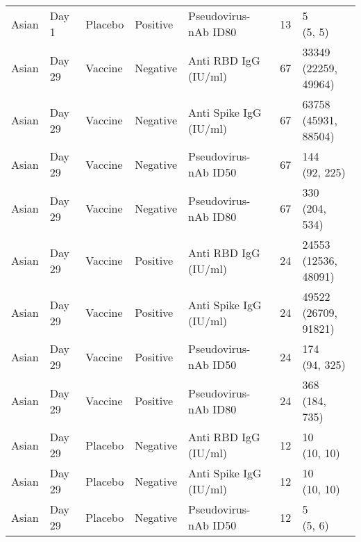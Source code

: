 \documentclass[]{book}
\theoremstyle{definition}
\theoremstyle{definition}
\theoremstyle{definition}
\newcommand{\1}{\mathbbm{1}}
\begin{document}
\begin{landscape}
\begin{ThreePartTable}
\begin{longtable}[t]{>{\raggedright\arraybackslash}p{7cm}llllll}
\hspace{1em}Asian & Day 1 & Placebo & Positive & Pseudovirus-nAb ID80 & 13 & \makecell[l]{5\\(5, 5)}\\
\hspace{1em}Asian & Day 29 & Vaccine & Negative & Anti RBD IgG (IU/ml) & 67 & \makecell[l]{33349\\(22259, 49964)}\\
\hspace{1em}Asian & Day 29 & Vaccine & Negative & Anti Spike IgG (IU/ml) & 67 & \makecell[l]{63758\\(45931, 88504)}\\
\hspace{1em}Asian & Day 29 & Vaccine & Negative & Pseudovirus-nAb ID50 & 67 & \makecell[l]{144\\(92, 225)}\\
\hspace{1em}Asian & Day 29 & Vaccine & Negative & Pseudovirus-nAb ID80 & 67 & \makecell[l]{330\\(204, 534)}\\
\hspace{1em}Asian & Day 29 & Vaccine & Positive & Anti RBD IgG (IU/ml) & 24 & \makecell[l]{24553\\(12536, 48091)}\\
\hspace{1em}Asian & Day 29 & Vaccine & Positive & Anti Spike IgG (IU/ml) & 24 & \makecell[l]{49522\\(26709, 91821)}\\
\hspace{1em}Asian & Day 29 & Vaccine & Positive & Pseudovirus-nAb ID50 & 24 & \makecell[l]{174\\(94, 325)}\\
\hspace{1em}Asian & Day 29 & Vaccine & Positive & Pseudovirus-nAb ID80 & 24 & \makecell[l]{368\\(184, 735)}\\
\hspace{1em}Asian & Day 29 & Placebo & Negative & Anti RBD IgG (IU/ml) & 12 & \makecell[l]{10\\(10, 10)}\\
\hspace{1em}Asian & Day 29 & Placebo & Negative & Anti Spike IgG (IU/ml) & 12 & \makecell[l]{10\\(10, 10)}\\
\hspace{1em}Asian & Day 29 & Placebo & Negative & Pseudovirus-nAb ID50 & 12 & \makecell[l]{5\\(5, 6)}\\

\end{longtable}
\end{ThreePartTable}
\end{landscape}
\end{document}
